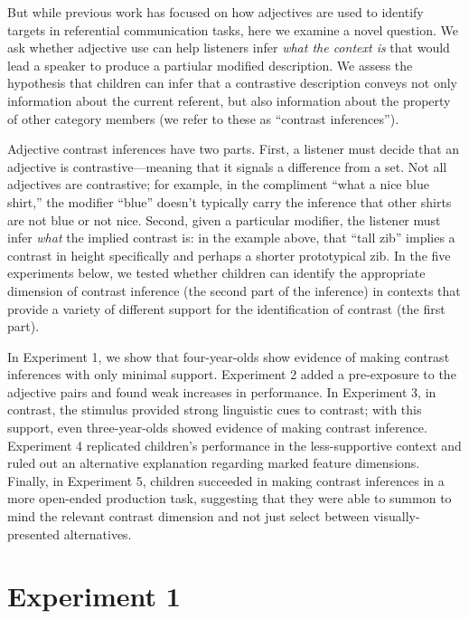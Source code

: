 \documentclass[man]{apa2}
\begin{document}
But while previous work has focused on how adjectives are used to identify targets in referential communication tasks, here we examine a novel question. We ask whether adjective use can help listeners infer \emph{what the context is} that would lead a speaker to produce a partiular modified description. We assess the hypothesis that children can infer that a contrastive description conveys not only information about the current referent, but also information about the property of other category members (we refer to these as ``contrast inferences'').  

Adjective contrast inferences have two parts. First, a listener must decide that an adjective is contrastive---meaning that it signals a difference from a set. Not all adjectives are contrastive; for example, in the compliment ``what a nice blue shirt,'' the modifier ``blue''  doesn't typically carry the inference that other shirts are not blue or not nice. Second, given a particular modifier, the listener must infer \emph{what} the implied contrast is: in the example above, that ``tall zib'' implies a contrast in height specifically and perhaps a shorter prototypical zib. In the five experiments below, we tested whether children can identify the appropriate dimension of contrast inference (the second part of the inference) in contexts that provide a variety of different support for the identification of contrast (the first part). 

In Experiment 1, we show that four-year-olds show evidence of making contrast inferences with only minimal support. Experiment 2 added a pre-exposure to the adjective pairs and found weak increases in performance. In Experiment 3, in contrast, the stimulus provided strong linguistic cues to contrast; with this support, even three-year-olds showed evidence of making contrast inference. Experiment 4 replicated children's performance in the less-supportive context and ruled out an alternative explanation regarding marked feature dimensions. Finally, in Experiment 5, children succeeded in making contrast inferences in a more open-ended production task, suggesting that they were able to summon to mind the relevant contrast dimension and not just select between visually-presented alternatives. 

\section{Experiment 1}
\end{document}
